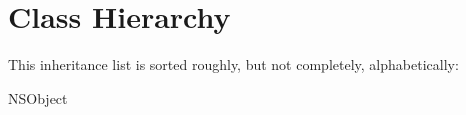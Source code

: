 \section{Class Hierarchy}
This inheritance list is sorted roughly, but not completely, alphabetically\+:\begin{DoxyCompactList}
\item N\+S\+Object\begin{DoxyCompactList}
\item {}
\begin{DoxyCompactList}
\item {}
\begin{DoxyCompactList}
\item {}
\item {}
\end{DoxyCompactList}
\end{DoxyCompactList}
\item {}
\item {}
\end{DoxyCompactList}
\end{DoxyCompactList}
